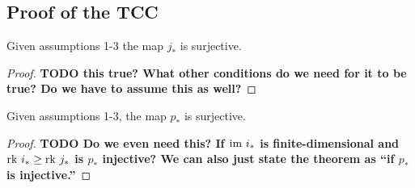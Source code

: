 
\subsection{Proof of the TCC}

\begin{lemma}\label{lem:jsurj}
    Given assumptions 1-3 the map $j_*$ is surjective.
\end{lemma}
\begin{proof}
    \textbf{TODO this true?
    What other conditions do we need for it to be true?
    Do we have to assume this as well?}
\end{proof}

\begin{lemma}\label{lem:psurj}
    Given assumptions 1-3, the map $p_*$ is surjective.
\end{lemma}
\begin{proof}
    \textbf{TODO Do we even need this?
    If $\mathrm{im}~i_*$ is finite-dimensional and $\mathrm{rk}~i_* \geq \mathrm{rk}~j_*$ is $p_*$ injective?
    We can also just state the theorem as ``if $p_*$ is injective.''}
\end{proof}
%
%
